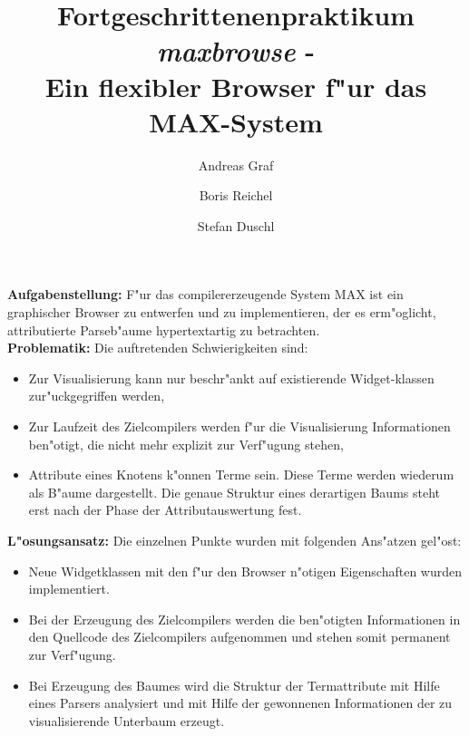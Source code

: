 
\originalTeX

\germanTeX

\pagestyle{plain}




\title{
Fortgeschrittenenpraktikum\\
\vspace*{1em}
{\em maxbrowse} -\\
Ein flexibler Browser f"ur das MAX-System}

\author{
  Andreas Graf
\and
  Boris Reichel
\and
  Stefan Duschl}

\maketitle

{\bf Aufgabenstellung:} F"ur das compilererzeugende System MAX ist
ein graphischer Browser zu entwerfen und zu implementieren, der
es erm"oglicht, attributierte Parseb"aume hypertextartig zu betrachten.\\[0.5cm]


{\bf Problematik:} Die auftretenden Schwierigkeiten sind:
\begin{itemize}
	\item Zur Visualisierung kann nur beschr"ankt auf existierende
		Widget-klassen zur"uckgegriffen werden,
	\item Zur Laufzeit des Zielcompilers werden f"ur die Visualisierung
	     Informationen ben"otigt, die nicht mehr explizit zur Verf"ugung
		stehen,
	\item Attribute eines Knotens k"onnen Terme sein. Diese Terme werden
		wiederum als B"aume dargestellt. Die genaue Struktur eines
		derartigen Baums steht erst nach der Phase der Attributauswertung
		fest.
\end{itemize}\par

{\bf L"osungsansatz:} Die einzelnen Punkte wurden mit folgenden Ans"atzen gel"ost:
\begin{itemize}
	\item Neue Widgetklassen mit den f"ur den Browser n"otigen Eigenschaften
		wurden implementiert.
	\item Bei der Erzeugung des Zielcompilers werden die ben"otigten Informationen
		in den Quellcode des Zielcompilers aufgenommen und stehen somit
		permanent zur Verf"ugung.
	\item Bei Erzeugung des Baumes wird die Struktur der Termattribute mit Hilfe
		eines Parsers analysiert und mit Hilfe der gewonnenen Informationen
		der zu visualisierende Unterbaum erzeugt.
\end{itemize}\par





